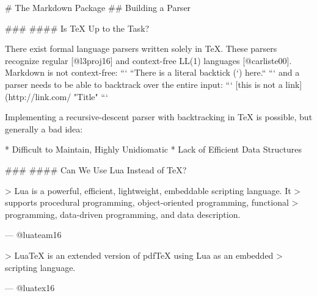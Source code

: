 \documentclass{beamer}
\begin{document}
\begin{darkframes}
\begin{frame}
\begin{get}
\end{frame}

# The Markdown Package
## Building a Parser

\begin{frame}

### \subsecname
#### Is \TeX{} Up to the Task?

There exist formal language parsers written solely in \TeX. These parsers
recognize regular [@l3proj16] and context-free LL(1) languages [@carliste00].
Markdown is not context-free:
```
``There is a literal backtick (`) here.``
```
and a parser needs to be able to backtrack over the entire input:
```
[this is not a link](http://link.com/ "Title"
```

Implementing a recursive-descent parser with backtracking in \TeX{} is
possible, but generally a bad idea:

  * Difficult to Maintain, Highly Unidiomatic
  * Lack of Efficient Data Structures

\end{frame}
\begin{frame}

### \subsecname
#### Can We Use Lua Instead of \TeX?

> Lua is a powerful, efficient, lightweight, embeddable scripting language. It
> supports procedural programming, object-oriented programming, functional
> programming, data-driven programming, and data description. 

\hfill --- @luateam16
\vfill

> Lua\TeX{} is an extended version of pdf\TeX{} using Lua as an embedded
> scripting language.

\hfill --- @luatex16

\end{frame}
\begin{frame}


\end{frame}
\end{darkframes}
\end{document}
